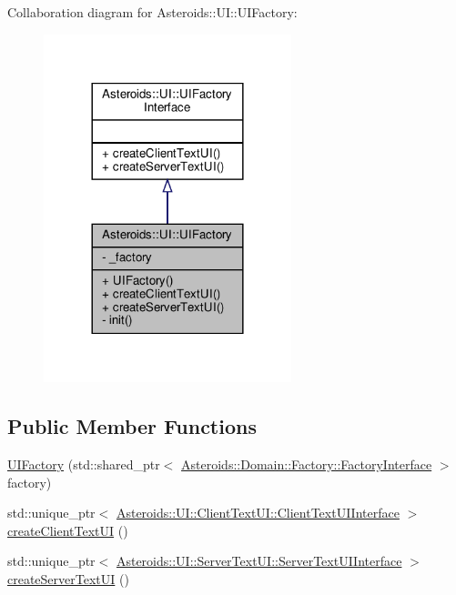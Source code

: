 Collaboration diagram for Asteroids\+:\+:UI\+:\+:U\+I\+Factory\+:\nopagebreak
\begin{figure}[H]
\begin{center}
\leavevmode
\includegraphics[width=204pt]{classAsteroids_1_1UI_1_1UIFactory__coll__graph}
\end{center}
\end{figure}
\subsection*{Public Member Functions}
\begin{DoxyCompactItemize}
\item 
\hyperlink{classAsteroids_1_1UI_1_1UIFactory_a47523bac4da1426badfd2dec54da7779}{U\+I\+Factory} (std\+::shared\+\_\+ptr$<$ \hyperlink{classAsteroids_1_1Domain_1_1Factory_1_1FactoryInterface}{Asteroids\+::\+Domain\+::\+Factory\+::\+Factory\+Interface} $>$ factory)
\item 
std\+::unique\+\_\+ptr$<$ \hyperlink{classAsteroids_1_1UI_1_1ClientTextUI_1_1ClientTextUIInterface}{Asteroids\+::\+U\+I\+::\+Client\+Text\+U\+I\+::\+Client\+Text\+U\+I\+Interface} $>$ \hyperlink{classAsteroids_1_1UI_1_1UIFactory_ac9a90bd87ef42d1b1af6ef9ff597aa28}{create\+Client\+Text\+UI} ()
\item 
std\+::unique\+\_\+ptr$<$ \hyperlink{classAsteroids_1_1UI_1_1ServerTextUI_1_1ServerTextUIInterface}{Asteroids\+::\+U\+I\+::\+Server\+Text\+U\+I\+::\+Server\+Text\+U\+I\+Interface} $>$ \hyperlink{classAsteroids_1_1UI_1_1UIFactory_abee314a786ce6f30022c008755e71805}{create\+Server\+Text\+UI} ()
\end{DoxyCompactItemize}
